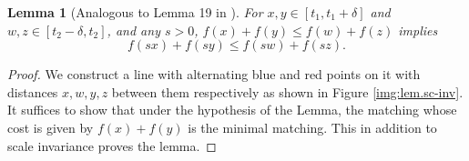 \documentclass{article}
\newtheorem{lemma}{Lemma}
\begin{document}
  \begin{lemma}[Analogous to Lemma 19 in \cite{minimal}] \label{lem:sc-inv}
    For $x,y\in[t_1,t_1+\delta]$ and $w,z\in[t_2-\delta,t_2]$, and any
    $s>0$, $f(x)+f(y)\leq f(w)+f(z)$ implies
    \begin{equation}
      f(sx)+f(sy)\leq f(sw)+f(sz).
    \end{equation}
  \end{lemma}

  \begin{proof}
    We construct a line with alternating blue and red points on it
    with distances $x,w,y,z$ between them respectively as shown in
    Figure \ref{img:lem.sc-inv}.
  It suffices to show that under the hypothesis of the Lemma, the
    matching whose cost is given by $f(x)+f(y)$ is the minimal
    matching. This in addition to scale invariance proves the lemma.



\end{proof}
\end{document}
